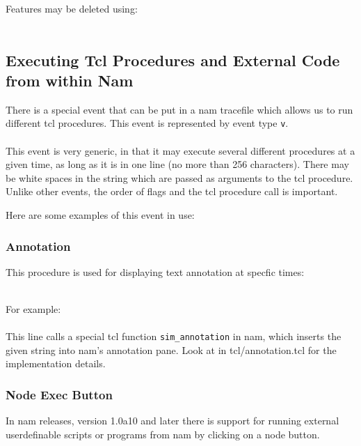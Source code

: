 Features may be deleted using:\\
\\

\subsection{Executing Tcl Procedures and External Code from within Nam}

There is a special event that can be put in a nam tracefile which allows us
to run different tcl procedures. This event is represented by event type {\tt v}.\\
\\
This event is very generic, in that it may execute several different procedures
at a given time, as long as it is in one line (no more than 256 characters).
There may be white spaces in the string which are passed as arguments to the tcl
procedure.  Unlike other events, the order of flags and the tcl procedure
call is important.

Here are some examples of this event in use:

\subsubsection{Annotation}
This procedure is used for displaying text annotation at specfic times:

\\

For example:\\
\\

This line calls a special tcl function {\tt sim\_annotation} in
nam, which inserts the given string 
into nam's annotation pane.  Look at  
 in 
tcl/annotation.tcl for the implementation details.

\subsubsection{Node Exec Button}
In nam releases, version 1.0a10 and later there is support for running external
userdefinable scripts or programs from nam by clicking on a node button.

\\

